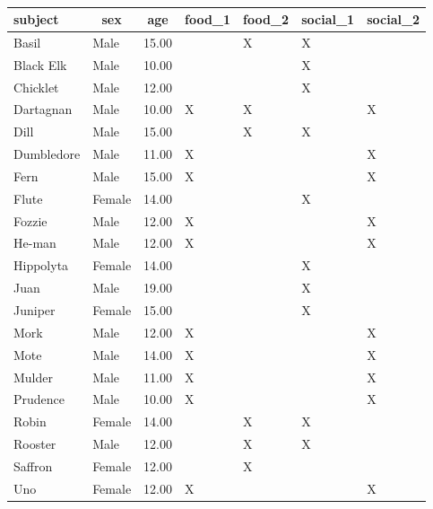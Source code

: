\documentclass[
]{article}
\begin{document}
\begin{table}[tbp]

\begin{center}
\begin{threeparttable}

\caption{\label{tab:unnamed-chunk-1}}

\begin{tabular}{lllllll}
\toprule
subject & \multicolumn{1}{c}{sex} & \multicolumn{1}{c}{age} & \multicolumn{1}{c}{food\_1} & \multicolumn{1}{c}{food\_2} & \multicolumn{1}{c}{social\_1} & \multicolumn{1}{c}{social\_2}\\
\midrule
Basil & Male & 15.00 &  & X & X & \\
Black Elk & Male & 10.00 &  &  & X & \\
Chicklet & Male & 12.00 &  &  & X & \\
Dartagnan & Male & 10.00 & X & X &  & X\\
Dill & Male & 15.00 &  & X & X & \\
Dumbledore & Male & 11.00 & X &  &  & X\\
Fern & Male & 15.00 & X &  &  & X\\
Flute & Female & 14.00 &  &  & X & \\
Fozzie & Male & 12.00 & X &  &  & X\\
He-man & Male & 12.00 & X &  &  & X\\
Hippolyta & Female & 14.00 &  &  & X & \\
Juan & Male & 19.00 &  &  & X & \\
Juniper & Female & 15.00 &  &  & X & \\
Mork & Male & 12.00 & X &  &  & X\\
Mote & Male & 14.00 & X &  &  & X\\
Mulder & Male & 11.00 & X &  &  & X\\
Prudence & Male & 10.00 & X &  &  & X\\
Robin & Female & 14.00 &  & X & X & \\
Rooster & Male & 12.00 &  & X & X & \\
Saffron & Female & 12.00 &  & X &  & \\
Uno & Female & 12.00 & X &  &  & X\\
\bottomrule
\end{tabular}

\end{threeparttable}
\end{center}

\end{table}
\end{document}
